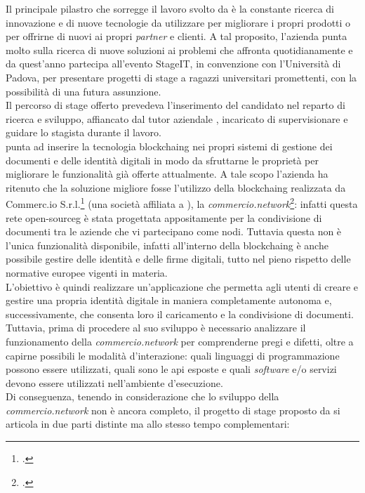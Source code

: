 Il principale pilastro che sorregge il lavoro svolto da \myCompany{} \companyTitle{} è la constante ricerca di innovazione e di nuove tecnologie da utilizzare per migliorare i propri prodotti o per offrirne di nuovi ai propri \textit{partner} e clienti. A tal proposito, l'azienda punta molto sulla ricerca di nuove soluzioni ai problemi che affronta quotidianamente e da quest'anno partecipa all'evento StageIT, in convenzione con l'Università di Padova, per presentare progetti di stage a ragazzi universitari promettenti, con la possibilità di una futura assunzione.\\
Il percorso di stage offerto prevedeva l'inserimento del candidato nel reparto di ricerca e sviluppo, affiancato dal tutor aziendale \myTutor, incaricato di supervisionare e guidare lo stagista durante il lavoro.\\
\myCompany{} \companyTitle{} punta ad inserire la tecnologia \gls{blockchaing}\glsfirstoccur{} nei propri sistemi di gestione dei documenti e delle identità digitali in modo da sfruttarne le proprietà per migliorare le funzionalità già offerte attualmente. A tale scopo l'azienda ha ritenuto che la soluzione migliore fosse l'utilizzo della \gls{blockchaing} realizzata da Commerc.io S.r.l.\footcite{site:commerc-io} (una società affiliata a \myCompany{} \companyTitle), la \textit{commercio.network}\footcite{site:commercio-network}: infatti questa rete \gls{open-sourceg}\glsfirstoccur{} è stata progettata appositamente per la condivisione di documenti tra le aziende che vi partecipano come nodi. Tuttavia questa non è l'unica funzionalità disponibile, infatti all'interno della \gls{blockchaing} è anche possibile gestire delle identità e delle firme digitali, tutto nel pieno rispetto delle normative europee vigenti in materia.\\
L'obiettivo è quindi realizzare un'applicazione che permetta agli utenti di creare e gestire una propria identità digitale in maniera completamente autonoma e, successivamente, che consenta loro il caricamento e la condivisione di documenti. Tuttavia, prima di procedere al suo sviluppo è necessario analizzare il funzionamento della \textit{commercio.network} per comprenderne pregi e difetti, oltre a capirne possibili le modalità d'interazione: quali linguaggi di programmazione possono essere utilizzati, quali sono le \gls{api}\glsfirstoccur{} esposte e quali \textit{software} e/o servizi devono essere utilizzati nell'ambiente d'esecuzione.\\
Di conseguenza, tenendo in considerazione che lo sviluppo della \textit{commercio.network} non è ancora completo, il progetto di stage proposto da \myCompany{} \companyTitle{} si articola in due parti distinte ma allo stesso tempo complementari:

